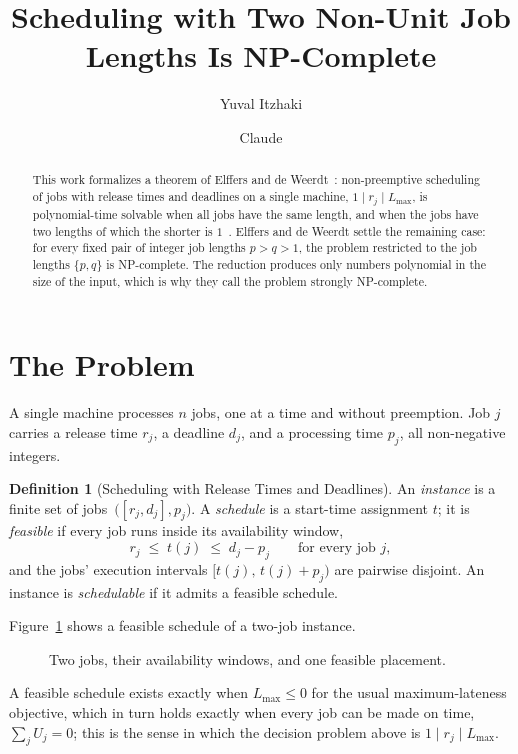 \documentclass[11pt,a4paper]{article}
\title{Scheduling with Two Non-Unit Job Lengths Is NP-Complete}
\author{Yuval Itzhaki \and Claude}
\date{}
\theoremstyle{definition}
\newtheorem{definition}{Definition}
\newcommand{\LMAX}{L_{\max}}
\begin{document}
\maketitle

\begin{abstract}
This work formalizes a theorem of Elffers and de Weerdt~\cite{EdW17}:
non-preemptive scheduling of jobs with release times and deadlines on a single
machine, $1\mid r_j\mid\LMAX$, is polynomial-time solvable when all jobs have the
same length, and when the jobs have two lengths of which the shorter is
$1$~\cite{Sgall12}. Elffers and de Weerdt settle the remaining case: for every fixed pair of integer
job lengths $p>q>1$, the problem restricted to the job lengths $\{p,q\}$ is
NP-complete. The reduction produces only numbers polynomial in the size of the
input, which is why they call the problem strongly NP-complete.
\end{abstract}

\section{The Problem}

A single machine processes $n$ jobs, one at a time and without preemption.
Job $j$ carries a release time $r_j$, a deadline $d_j$, and a processing time
$p_j$, all non-negative integers.

\begin{definition}[Scheduling with Release Times and Deadlines]
\label{def:scheduling}
An \emph{instance} is a finite set of jobs~$\big([r_j,d_j],p_j\big)$. A
\emph{schedule} is a start-time assignment $t$; it is \emph{feasible} if
every job runs inside its availability window,
\[
  r_j \;\le\; t(j) \;\le\; d_j - p_j \qquad\text{for every job } j,
\]
and the jobs' execution intervals $[t(j),\,t(j)+p_j)$ are pairwise disjoint.
An instance is \emph{schedulable} if it admits a feasible schedule.
\end{definition}

Figure~\ref{fig:instance} shows a feasible schedule of a two-job instance.

\begin{figure}[h]
\centering

\caption{Two jobs, their availability windows, and one feasible placement.}
\label{fig:instance}
\end{figure}

A feasible schedule exists exactly when $\LMAX\le 0$ for the usual
maximum-lateness objective, which in turn holds exactly when every job can be
made on time, $\sum_j U_j = 0$; this is the sense in which the decision
problem above is $1\mid r_j\mid\LMAX$.
\end{document}
